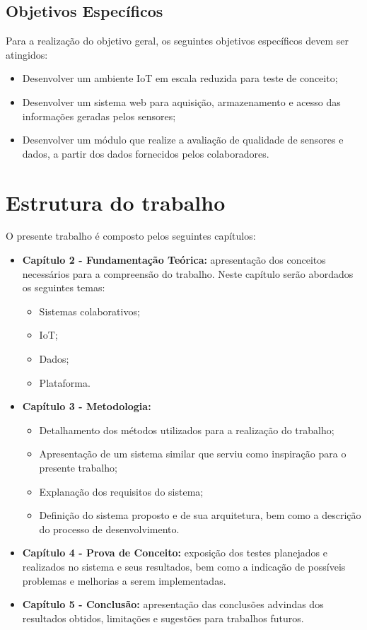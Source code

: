 \subsection{Objetivos Específicos}
Para a realização do objetivo geral, os seguintes objetivos específicos devem ser atingidos:
\begin{itemize}
  \item Desenvolver um ambiente \acrshort{IoT} em escala reduzida para teste de conceito;
  \item Desenvolver um sistema web para aquisição, armazenamento e acesso das informações geradas pelos sensores;
  \item Desenvolver um módulo que realize a avaliação de qualidade de sensores e dados, a partir dos dados fornecidos pelos colaboradores.
\end{itemize}
\section{Estrutura do trabalho}
O presente trabalho é composto pelos seguintes capítulos:
\begin{itemize}
  \item \textbf{Capítulo 2 - Fundamentação Teórica:} apresentação dos conceitos necessários para a compreensão do
  trabalho. Neste capítulo serão abordados os seguintes temas:
  \begin{itemize}
    \item Sistemas colaborativos;
    \item \acrlong{IoT};
    \item Dados;
    \item Plataforma.
  \end{itemize}
  \item \textbf{Capítulo 3 - Metodologia:}
\begin{itemize}
  \item Detalhamento dos métodos utilizados para a realização do trabalho;
  \item Apresentação de um sistema similar que serviu como inspiração para o presente trabalho;
  \item Explanação dos requisitos do sistema;
  \item Definição do sistema proposto e de sua arquitetura, bem como a descrição do processo de desenvolvimento.
\end{itemize}
  \item \textbf{Capítulo 4 - Prova de Conceito:} exposição dos testes planejados e realizados no sistema e seus resultados, bem como a indicação de possíveis problemas e melhorias a serem implementadas.
  \item \textbf{Capítulo 5 - Conclusão:} apresentação das conclusões advindas dos resultados obtidos, limitações e
  sugestões para trabalhos futuros.
\end{itemize}

